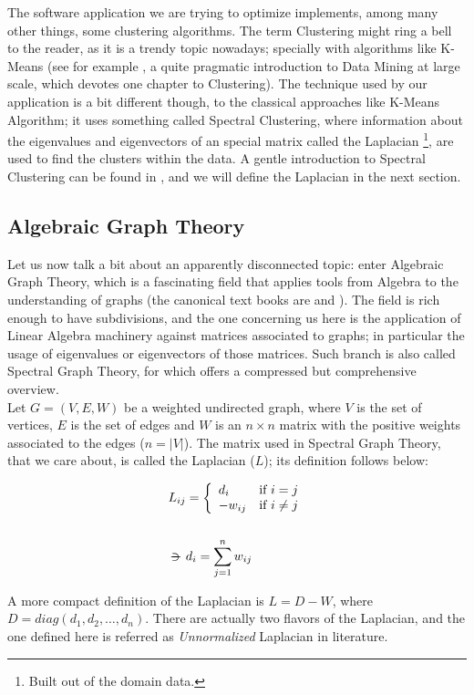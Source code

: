 The software application we are trying to optimize implements, among
many other things, some clustering
algorithms. The term Clustering might
ring a bell to the reader, as it is a trendy topic nowadays; specially
with algorithms like K-Means (see for example \cite{rajaraman14}, a
quite pragmatic 
introduction to Data Mining at large scale, which devotes one chapter
to Clustering). The technique used by our application is a bit
different though, to the classical approaches like K-Means Algorithm;
it uses something called Spectral Clustering, where information about the
eigenvalues and eigenvectors of an special matrix called the Laplacian
\footnote{Built out of the domain data.}, are used to find the clusters
within the data. A gentle introduction to Spectral Clustering can be
found in \cite{luxburg07}, and we will define the Laplacian
in the next section. \\

\subsection{Algebraic Graph Theory}

Let us now talk a bit about an apparently disconnected topic: enter
Algebraic Graph Theory, which is a fascinating field that 
applies tools from Algebra to the understanding of graphs
(the canonical text books are \cite{biggs93} and \cite{godsil01}). The field
is rich enough to have subdivisions, and the one concerning us here is
the application of Linear Algebra machinery against matrices
associated to graphs; in particular the usage of eigenvalues or
eigenvectors of those matrices. Such branch is also called
Spectral Graph Theory, for which \cite{brouwer12} offers a compressed but
comprehensive overview. \\

Let $G = (V,E,W)$ be a weighted undirected graph, where $V$ is the set
of vertices, $E$ is the set of edges and $W$ is an $n \times n$ matrix
with the positive weights associated to the edges ($n = |V|$). The
matrix used in Spectral Graph Theory, that we care about, is
called the Laplacian ($L$); its definition follows below: 

\begin{align*}
  L_{ij} &= \twopartdef{d_i}{i = j}{-w_{ij}}{i \ne j} \\\\
    \suchthat & d_i = \sum_{j=1}^n w_{ij}
\end{align*}
\hfill

A more compact definition of the Laplacian is $L = D - W$, where $D =
diag({d_1,d_2,\dots,d_n})$. There are actually two flavors of the
Laplacian, and the one defined here is referred as \emph{Unnormalized}
Laplacian in literature. \\

